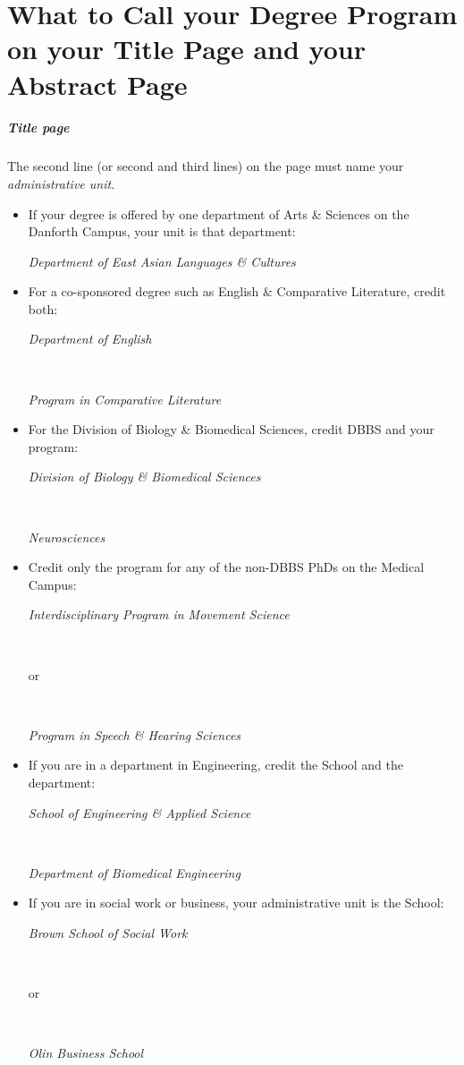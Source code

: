 
\chapter[Degree Program]{What to Call your Degree Program on your Title Page and your Abstract Page}
\label{app:degree-program}

\paragraph{Title page}
The second line (or second and third lines) on the page must name your \emph{administrative unit}.

\begin{itemize}
\item If your degree is offered by one department of Arts \& Sciences on the Danforth Campus, your unit is that department: \\
\centerline{\emph{Department of East Asian Languages \& Cultures}}

\item For a co-sponsored degree such as English \& Comparative Literature, credit both: \\
\centerline{\emph{Department of English}}\\
\centerline{\emph{Program in Comparative Literature}}

\item For the Division of Biology \& Biomedical Sciences, credit DBBS and your program: \\
\centerline{\emph{Division of Biology \& Biomedical Sciences}}\\
\centerline{\emph{Neurosciences}}

\item Credit only the program for any of the non-DBBS PhDs on the Medical Campus: \\
\centerline{\emph{Interdisciplinary Program in Movement Science}}\\
\centerline{or}\\
\centerline{\emph{Program in Speech \& Hearing Sciences}}

\item If you are in a department in Engineering, credit the School and the department: \\
\centerline{\emph{School of Engineering \& Applied Science}}\\
\centerline{\emph{Department of Biomedical Engineering}}

\item If you are in social work or business, your administrative unit is the School: \\
\centerline{\emph{Brown School of Social Work}}\\
\centerline{or}\\
\centerline{\emph{Olin Business School}}
\end{itemize}

